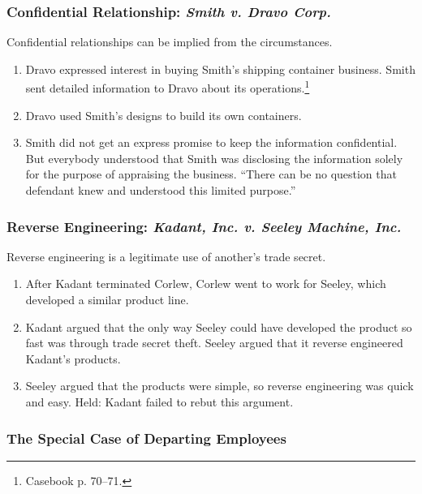 \subsubsection{Confidential Relationship: \emph{Smith v. Dravo Corp.}}

Confidential relationships can be implied from the circumstances.

\begin{enumerate}
    \item Dravo expressed interest in buying Smith's shipping container 
    business. Smith sent detailed information to Dravo about its 
    operations.\footnote{Casebook p. 70--71.}
    \item Dravo used Smith's designs to build its own containers.
    \item Smith did not get an express promise to keep the information 
    confidential. But everybody understood that Smith was disclosing the 
    information solely for the purpose of appraising the business. ``There can 
    be no question that defendant knew and understood this limited purpose.''
\end{enumerate}

\subsubsection{Reverse Engineering: \emph{Kadant, Inc. v. Seeley Machine, Inc.}}

Reverse engineering is a legitimate use of another's trade secret.

\begin{enumerate}
    \item After Kadant terminated Corlew, Corlew went to work for Seeley, 
    which developed a similar product line.
    \item Kadant argued that the only way Seeley could have developed the 
    product so fast was through trade secret theft. Seeley argued that it 
    reverse engineered Kadant's products.
    \item Seeley argued that the products were simple, so reverse engineering 
    was quick and easy. Held: Kadant failed to rebut this argument.
\end{enumerate}

\subsubsection{The Special Case of Departing Employees}


